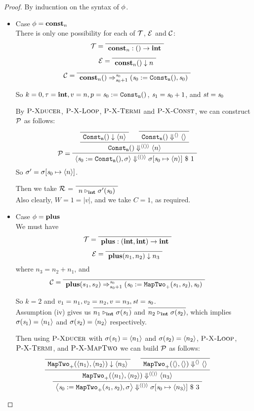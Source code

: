 \begin{proof}
By inducntion on the syntax of $\phi$.
\begin{itemize}
	\item \label{thm-case-const} Case $\phi = \mathbf{const}_{n}$ \\ 	
	There is only one possibility for each of $\mathcal{T}$, $\mathcal{E}$ and $\mathcal{C}$:
	$$\MT = \PT{ \Axiom{\Typef{\constn{n}}{}{\int}}}$$
	$$\ME = \PT{\Axiom{\EvalF{\constn{n}}{}{n}}}$$
	$$\MC = \PT{\Axiom{\Transf{\constn{n}}{}{\s_0}{\s_0+1}
			{\sfun{\sdef{\s_0}{\constaf{n}}}{\s_0}}}}$$

\def\pconst{\sdef{\s_0}{\constaf{n}}}
	So $k=0,\tau = \int, v = n, p = \pconst$, $\mathit{s}_1 = \mathit{s}_0+1$, and $\mathit{st} = \mathit{s}_0$

	By $\textsc{P-Xducer}$, $\textsc{P-X-Loop}$, $\textsc{P-X-Termi}$ and $\textsc{P-X-Const}$, we can construct $\mathcal{P}$ as follows:
	$$\PT{
		\Axiom{\blockf{\consta{n}}{}{\singl{n}}}
		\Axiom{\sevalfg{\consta{n}}{}{\emptyv}{\emptyv}}
		\BC{\sevalfg{\consta{n}}{}{\vunit}{\singl{n}}}
		\LeLa{\MP = }
		\UC{\seval{\pconst}{\sgm}{\vunit}{\sgm[\s_0 \|-> \singl{n}]}{1}}			
	}$$
	So $\sgm' = \sgm[\s_0 \|-> \singl{n}]$.
	
	Then we take $\mathcal{R}$ = $\PT{\Axiom{\ValRep{n}{\int}{\sgm'(\s_0)}}}$ \\
	Also clearly, $ W = 1 = |v|$, and we take $C=1$, as required.
	
		
	\item \label{thm-case-plus} Case $\phi = \mathbf{plus}$ \\ 	
	We must have 
	$$\MT = \PT{\Axiom{\Typef{\plusn}{\int,\int}{\int}}}$$
	$$\ME = \PT{\Axiom{\EvalF{\plusn}{n_1,n_2}{n_3}}}$$ where $n_3 = n_2 + n_1$, and 
	$$\MC = \PT{\Axiom{\Transf{\plusn}{s_1,s_2}{\s_0}{s_0+1}
			{\sfun{\sdef{\s_0}{\maptwof{+}{\s_1}{\s_2}}}}{\s_0}}}$$

\def\pplus{\sdef{\s_0}{\maptwof{+}{\s_1}{\s_2}}}	
	So $k=2$ and $v_1= n_1, v_2= n_2, v = n_3, \mathit{st} = \mathit{s}_0$. \\
	 
	 Assumption (iv) gives us
	 $\infer{\ValRep{n_1}{\int}{\sgm(\s_1)}}{}$ and 
	 $\infer{\ValRep{n_2}{\int}{\sgm(\s_2)}}{}$, which implies
	 $\sigma(\mathit{s}_1) = \langle n_1 \rangle$ and $\sigma(\mathit{s}_2) = \langle n_2 \rangle$ respectively. 
	 
	 
	 Then using $\textsc{P-Xducer}$ with $\sigma(\mathit{s}_1)= \langle n_1 \rangle$ and $ \sigma(\mathit{s}_2) = \langle n_2 \rangle$,  $\textsc{P-X-Loop}$, $\textsc{P-X-Termi}$,
	 and $\textsc{P-X-MapTwo}$ 
	 we can build $\mathcal{P}$ as follows: 
	 $$\PT{
		\Axiom{\blockf{\maptwo{+}}{\singl{n_1}, \singl{n_2}}{\singl{n_3}}}
		\Axiom{\sevalfg{\maptwo{+}}{\emptyv,\emptyv}{\emptyv}{\emptyv}}
		\BC{\sevalfg{\maptwo{+}}{\singl{n_1},\singl{n_2}}{\vunit}{\singl{n_3}}}
		\UC{\seval{\pplus}{\sgm}{\vunit}{\sgm[\s_0 \|-> \singl{n_3}]}{3}}
	 }$$  
		

\end{itemize}
\end{proof}
